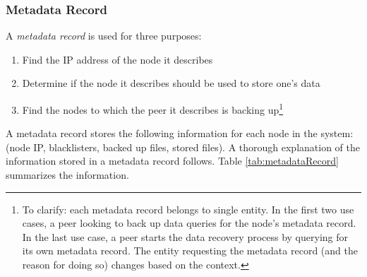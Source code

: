 \documentclass[12pt]{report}
\begin{document}
\subsubsection{Metadata Record} \label{subsubsec:MetadataRecord}

A \textit{metadata record} is used for three purposes:

\begin{enumerate}
  \item Find the IP address of the node it describes
  \item Determine if the node it describes should be used to store one's data 
  \item Find the nodes to which the peer it describes is backing up\footnote{To clarify: each metadata record belongs to single entity. In the first two use cases, a peer looking to back up data queries for the node's metadata record. In the last use case, a peer starts the data recovery process by querying for its own metadata record. The entity requesting the metadata record (and the reason for doing so) changes based on the context.}
\end{enumerate}

A metadata record stores the following information for each node in the system: (node IP, blacklisters, backed up files, stored files). A thorough explanation of the information stored in a metadata record follows. Table \ref{tab:metadataRecord} summarizes the information.
\end{document}
